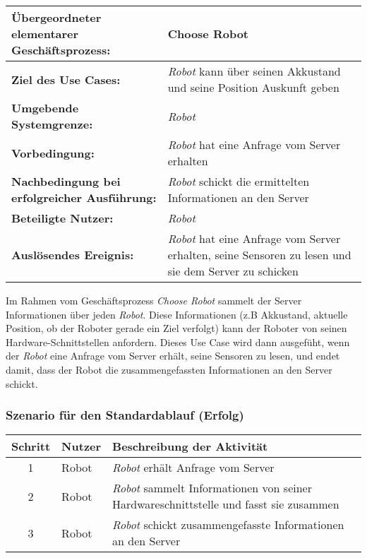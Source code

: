 \documentclass[includeheaders]{scrartcl}
\begin{document}
			\begin{table}[H]
				\centering
				\begin{tabularx}{\textwidth}{@{}p{5cm}X@{}}
				\toprule
				\textbf{Übergeordneter elementarer Geschäftsprozess:} & Choose Robot\\ \midrule
				\textbf{Ziel des Use Cases:} & \emph{Robot} kann über seinen Akkustand und seine Position Auskunft geben\\ \midrule
				\textbf{Umgebende Systemgrenze:} & \emph{Robot} \\ \midrule
				\textbf{Vorbedingung:} & \emph{Robot} hat eine Anfrage vom Server erhalten \\ \midrule
				\textbf{Nachbedingung bei erfolgreicher Ausführung:} & \emph{Robot} schickt die ermittelten Informationen an den Server \\ \midrule
				\textbf{Beteiligte Nutzer:} & \emph{Robot} \\ \midrule
				\textbf{Auslösendes Ereignis:} & \emph{Robot} hat eine Anfrage vom Server erhalten, seine Sensoren zu lesen und sie dem Server zu schicken \\
				\bottomrule
				\end{tabularx}
			\end{table}

			Im Rahmen vom Geschäftsprozess \emph{Choose Robot} sammelt der Server
			Informationen über jeden \emph{Robot}. Diese Informationen (z.B
			Akkustand, aktuelle Position, ob der Roboter gerade ein Ziel verfolgt)
			kann der Roboter von seinen Hardware-Schnittstellen anfordern. Dieses
			Use Case wird dann ausgefüht, wenn der \emph{Robot} eine Anfrage vom
			Server erhält, seine Sensoren zu lesen, und endet damit, dass der Robot
			die zusammengefassten Informationen an den Server schickt.

			\subsubsection*{Szenario für den Standardablauf (Erfolg)}

			\begin{table}[H]
				\centering
				\begin{tabularx}{\textwidth}{@{}cp{2cm}X@{}}
				\toprule
				Schritt & Nutzer & Beschreibung der Aktivität \\ \midrule
				1 & Robot & \emph{Robot} erhält Anfrage vom Server \\
				2 & Robot & \emph{Robot} sammelt Informationen von seiner Hardwareschnittstelle und fasst sie zusammen \\
				3 & Robot & \emph{Robot} schickt zusammengefasste Informationen an den Server \\
				\bottomrule
				\end{tabularx}
			\end{table}
\end{document}
